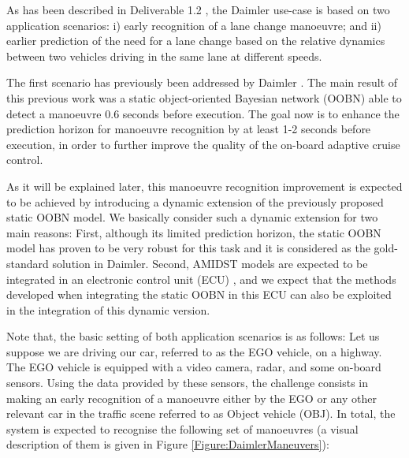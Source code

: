 As has been described in Deliverable 1.2 \cite{Fer14b}, the Daimler use-case is based on two application scenarios: i) early recognition of a lane change manoeuvre; and ii) earlier prediction of the need for a lane change based on the relative dynamics between two vehicles driving in the same lane at different speeds. 

The first scenario has previously been addressed by Daimler \cite{Kasper2011,kasper2012object,KasperThesis2013}. The main result of this previous work was a static object-oriented Bayesian network (OOBN) \cite{KollerPfeffer1997} able to detect a manoeuvre 0.6 seconds before execution. The goal now is to enhance the prediction horizon for manoeuvre recognition by at least 1-2 seconds before execution, in order to further improve the quality of the on-board adaptive cruise control. 

As it will be explained later, this manoeuvre recognition improvement is expected to be achieved by introducing a dynamic extension of the previously proposed static OOBN model. We basically consider such a dynamic extension for two main reasons: First, although its limited prediction horizon, the static OOBN model has proven to be very robust for this task and it is considered as the gold-standard solution in Daimler. Second, AMIDST models are expected to be integrated in an electronic control unit (ECU) \cite{Fer14}, and we expect that the methods developed when integrating the static OOBN in this ECU \cite{Weidl2014} can also be exploited in the integration of this dynamic version. 

Note that, the basic setting of both application scenarios is as follows: Let us suppose we are driving our car, referred to as the EGO vehicle, on a highway. The EGO vehicle is equipped with a video camera, radar, and some on-board sensors. Using the data provided by these sensors, the challenge consists in making an early recognition of a manoeuvre either by the EGO or any other relevant car in the traffic scene referred to as Object vehicle (OBJ). In total, the system is expected to recognise the following set of manoeuvres (a visual description of them is given in Figure \ref{Figure:DaimlerManeuvers}):

